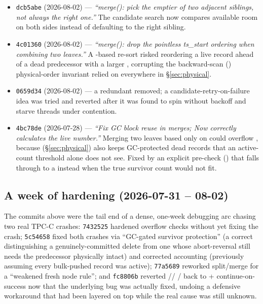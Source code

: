 \documentclass[11pt]{article}
\newcommand{\commit}[1]{\texttt{#1}}
\begin{document}
\begin{itemize}
  \item \commit{dcb5abe} (2026-08-02) --- \emph{``merge(): pick the emptier of two
        adjacent siblings, not always the right one.''} The candidate search now
        compares available room on both sides instead of defaulting to the right sibling.
  \item \commit{4c01360} (2026-08-02) --- \emph{``merge(): drop the pointless
        ts\_start ordering when combining two leaves.''} A -based re-sort
        risked reordering a live record ahead of a dead predecessor with a larger
        , corrupting the backward-scan () physical-order
        invariant relied on everywhere in \S\ref{sec:physical}.
  \item \commit{0659d34} (2026-08-02) --- a redundant 
        removed; a candidate-retry-on-failure idea was tried and reverted after it was
        found to spin without backoff and starve threads under contention.
  \item \commit{4bc78de} (2026-07-28) --- \emph{``Fix GC block reuse in merges; Now
        correctly calculates the live number.''} Merging two leaves based only on
         could overflow , because
         (\S\ref{sec:physical}) also keeps GC-protected dead
        records that an active-count threshold alone does not see. Fixed by an explicit
         pre-check () that falls
        through to a  instead when the true survivor count would not fit.
\end{itemize}

\subsection{A week of hardening (2026-07-31 -- 08-02)}

The commits above were the tail end of a dense, one-week debugging arc chasing two real
TPC-C crashes: \commit{7432525} hardened  overflow checks without yet
fixing the crash; \commit{5c54658} fixed both crashes via ``GC-gated survivor
protection'' (a correct  distinguishing a genuinely-committed
delete from one whose abort-reversal still needs the predecessor physically intact) and
corrected  accounting (previously assuming every bulk-pushed record was
active); \commit{77a5689} reworked split/merge for a ``weakened fresh node rule''; and
\commit{fc8806b} reverted //
/ back to  + continue-on-success now that
the underlying bug was actually fixed, undoing a defensive workaround that had been
layered on top while the real cause was still unknown.
\end{document}
